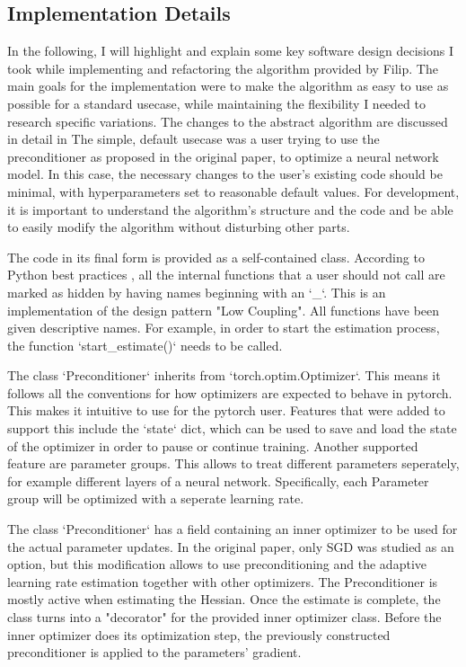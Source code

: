 \documentclass[twoside,12pt,a4paper]{report}
\begin{document}
\subsection{Implementation Details}
\begin{markdown}
In the following, I will highlight and explain some key software design decisions I took while implementing and refactoring the algorithm provided by Filip.
The main goals for the implementation were to make the algorithm as easy to use as possible for a standard usecase, while maintaining the flexibility I needed to research specific variations. The changes to the abstract algorithm are discussed in detail in  The simple, default usecase was a user trying to use the preconditioner as proposed in the original paper, to optimize a neural network model. In this case, the necessary changes to the user's existing code should be minimal, with hyperparameters set to reasonable default values. For development, it is important to understand the algorithm's structure and the code and be able to easily modify the algorithm without disturbing other parts.

The code in its final form is provided as a self-contained class. According to Python best practices , all the internal functions that a user should not call are marked as hidden by having names beginning with an `_`. This is an implementation of the design pattern "Low Coupling". All functions have been given descriptive names. For example, in order to start the estimation process, the function `start_estimate()` needs to be called.

The class `Preconditioner` inherits from `torch.optim.Optimizer`. This means it follows all the conventions for how optimizers are expected to behave in pytorch. This makes it intuitive to use for the pytorch user. Features that were added to support this include the `state` dict, which can be used to save and load the state of the optimizer in order to pause or continue training. Another supported feature are parameter groups. This allows to treat different parameters seperately, for example different layers of a neural network. Specifically, each Parameter group will be optimized with a seperate learning rate.

The class `Preconditioner` has a field containing an inner optimizer to be used for the actual parameter updates. In the original paper, only SGD was studied as an option, but this modification allows to use preconditioning and the adaptive learning rate estimation together with other optimizers. The Preconditioner is mostly active when estimating the Hessian. Once the estimate is complete, the class turns into a "decorator" for the provided inner optimizer class. Before the inner optimizer does its optimization step, the previously constructed preconditioner is applied to the parameters' gradient.


\end{markdown}
\end{document}
